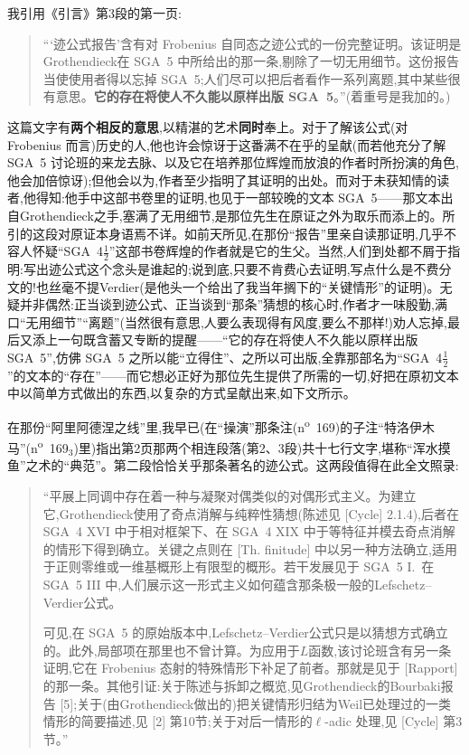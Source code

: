 我引用《引言》第3段的第一页:

\begin{quote}
“‘迹公式报告’含有对 Frobenius 自同态之迹公式的一份完整证明。该证明是Grothendieck在 SGA~5 中所给出的那一条,剔除了一切无用细节。这份报告当使使用者得以忘掉 SGA~5;人们尽可以把后者看作一系列离题,其中某些很有意思。\textbf{它的存在将使人不久能以原样出版 SGA~5}。”(着重号是我加的。)
\end{quote}

这篇文字有\textbf{两个相反的意思},以精湛的艺术\textbf{同时}奉上。对于了解该公式(对 Frobenius 而言)历史的人,他也许会惊讶于这番满不在乎的呈献(而若他充分了解 SGA~5 讨论班的来龙去脉、以及它在培养那位辉煌而放浪的作者时所扮演的角色,他会加倍惊讶);但他会以为,作者至少指明了其证明的出处。而对于未获知情的读者,他得知:他手中这部书卷里的证明,也见于一部较晚的文本 SGA~5——那文本出自Grothendieck之手,塞满了无用细节,是那位先生在原证之外为取乐而添上的。所引的这段对原证本身语焉不详。如前天所见,在那份“报告”里亲自读那证明,几乎不容人怀疑“SGA~4$\frac{1}{2}$”这部书卷辉煌的作者就是它的生父。当然,人们到处都不屑于指明:写出迹公式这个念头是谁起的;说到底,只要不肯费心去证明,写点什么是不费分文的!也丝毫不提Verdier(是他头一个给出了我当年搁下的“关键情形”的证明)。无疑并非偶然:正当谈到迹公式、正当谈到“那条”猜想的核心时,作者才一味殷勤,满口“无用细节”“离题”(当然很有意思,人要么表现得有风度,要么不\dmark{}那样!)劝人忘掉,最后又添上一句既含蓄又专断的提醒——“它的存在将使人不久能以原样出版 SGA~5”,仿佛 SGA~5 之所以能“立得住”、之所以可出版,全靠那部名为“SGA~4$\frac{1}{2}$”的文本的“存在”——而它想必正好为那位先生提供了所需的一切,好把在原初文本中以简单方式做出的东西,以复杂的方式呈献出来,如下文所示。

在那份“阿里阿德涅之线”里,我早已(在“操演”那条注(n\textsuperscript{o}~169)的子注“特洛伊木马”(n\textsuperscript{o}~169$_3$)里)指出第2页那两个相连段落(第2、3段)共十七行文字,堪称“浑水摸鱼”之术的“典范”。第二段恰恰关乎那条著名的迹公式。这两段值得在此全文照录:

\begin{quote}
“平展上同调中存在着一种与凝聚对偶类似的对偶形式主义。为建立它,Grothendieck使用了奇点消解与纯粹性猜想(陈述见 [Cycle] 2.1.4),后者在 SGA~4 XVI 中于相对框架下、在 SGA~4 XIX 中于等特征并模去奇点消解的情形下得到确立。关键之点则在 [Th. finitude] 中以另一种方法确立,适用于正则零维或一维基概形上有限型的概形。若干发展见于 SGA~5 I.~在 SGA~5 III 中,人们展示这一形式主义如何蕴含那条极一般的Lefschetz--Verdier公式。

可见,在 SGA~5 的原始版本中,Lefschetz--Verdier公式只是以猜想方式确立的。此外,局部项在那里也不曾计算。为应用于$L$函数,该讨论班含有另一条证明,它在 Frobenius 态射的特殊情形下补足了前者。那就是见于 [Rapport] 的那一条。其他引证:关于陈述与拆卸之概览,见Grothendieck的Bourbaki报告 [5];关于(由Grothendieck做出的)把关键情形归结为Weil已处理过的一类情形的简要描述,见 [2] 第10节;关于对后一情形的$\ell$-adic 处理,见 [Cycle] 第3节。”
\end{quote}

